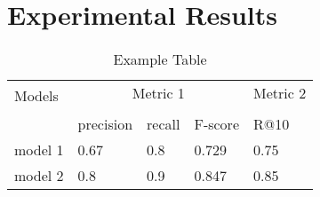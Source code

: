 \documentclass{article}
\begin{document}




\section{Experimental Results}







\begin{table}[h]
    \centering
    \label{tab:example-table}
    \caption{Example Table}
    \begin{tabular}{lllll}
        \toprule
        \multirow{2}{*}{Models} & \multicolumn{3}{c}{Metric 1} & Metric 2\\
        \cmidrule{2-4} \cmidrule{5-5} \\
        {} & precision & recall & F-score  & R@10 \\
        \midrule
        model 1 & 0.67  & 0.8 & 0.729  & 0.75 \\
        model 2 & 0.8 & 0.9 & 0.847 & 0.85 \\
        \bottomrule
    \end{tabular}
\end{table}



\end{document}
